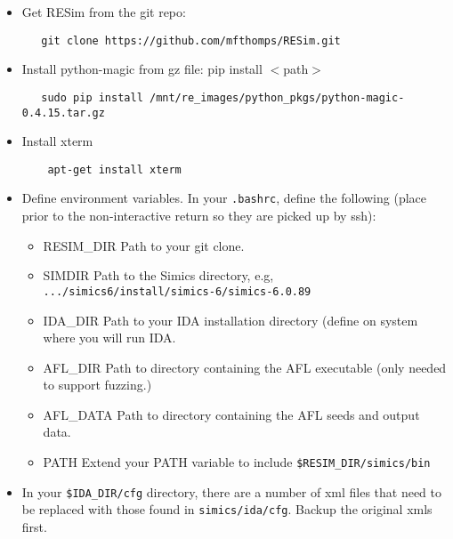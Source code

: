 \documentclass[titlepage]{article}
\begin{document}
\begin{itemize}
\item Get RESim from the git repo:
\begin{verbatim}
   git clone https://github.com/mfthomps/RESim.git
\end{verbatim}
\item Install python-magic from gz file:  pip install $<$path$>$
\begin{verbatim}
   sudo pip install /mnt/re_images/python_pkgs/python-magic-0.4.15.tar.gz
\end{verbatim}
\item Install xterm
\begin{verbatim}
    apt-get install xterm
\end{verbatim}
\item Define environment variables.  In your {\tt .bashrc}, define the following (place prior to the 
non-interactive return so they are picked up by ssh):
\begin{itemize}
\item RESIM\_DIR  Path to your git clone.
\item SIMDIR  Path to the Simics directory, e.g, {\tt .../simics6/install/simics-6/simics-6.0.89}
\item IDA\_DIR Path to your IDA installation directory (define on system where you will run IDA.
\item AFL\_DIR Path to directory containing the AFL executable (only needed to support fuzzing.)
\item AFL\_DATA Path to directory containing the AFL seeds and output data.
\item PATH Extend your PATH variable to include {\tt \$RESIM\_DIR/simics/bin}
\end{itemize}

\item In your {\tt \$IDA\_DIR/cfg} directory, there are a number of xml files that need to be replaced with those found
in {\tt simics/ida/cfg}.  Backup the original xmls first.
\end{itemize}
\end{document}
